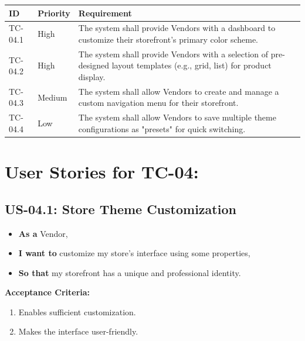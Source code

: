 \begin{table}[H]
\centering
\label{tab:vendor-requirements}
\begin{tabular}{>{\raggedright\arraybackslash}p{2cm}>{\raggedright\arraybackslash}p{3cm}>{\raggedright\arraybackslash}p{7cm}>{\centering\arraybackslash}p{2cm}}
\toprule
\textbf{ID} & \textbf{Priority} & \textbf{Requirement} \\
\midrule
TC-04.1 & High & The system shall provide Vendors with a dashboard to customize their storefront's primary color scheme.\\
\midrule
TC-04.2 & High & The system shall provide Vendors with a selection of pre-designed layout templates (e.g., grid, list) for product display.\\
\midrule
TC-04.3 & Medium & The system shall allow Vendors to create and manage a custom navigation menu for their storefront.  \\
\midrule
TC-04.4 & Low & The system shall allow Vendors to save multiple theme configurations as "presets" for quick switching. \\
\bottomrule
\end{tabular}
\end{table}

\section*{User Stories for TC-04: }

\subsection*{US-04.1: Store Theme Customization}
\begin{itemize}
    \item \textbf{As a} Vendor,
    \item \textbf{I want to} customize my store’s interface using some properties,
    \item \textbf{So that} my storefront has a unique and professional identity.
\end{itemize}

\noindent\textbf{Acceptance Criteria:}
\begin{enumerate}
    \item Enables sufficient customization.
    \item Makes the interface user-friendly.

\end{enumerate}



